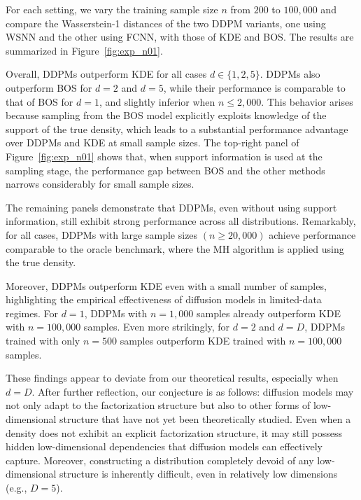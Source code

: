 \documentclass[twoside,11pt]{article}
\begin{document}
For each setting, we vary the training sample size $n$ from $200$ to $100{,}000$ and compare the Wasserstein-1 distances of the two DDPM variants, one using WSNN and the other using FCNN, with those of KDE and BOS. The results are summarized in Figure~\ref{fig:exp_n01}.

Overall, DDPMs outperform KDE for all cases $d \in \{1,2,5\}$.
DDPMs also outperform BOS for $d = 2$ and $d = 5$, while their performance is comparable to that of BOS for $d = 1$, and slightly inferior when $n \leq 2{,}000$.
This behavior arises because sampling from the BOS model explicitly exploits knowledge of the support of the true density, which leads to a substantial performance advantage over DDPMs and KDE at small sample sizes.
The top-right panel of Figure~\ref{fig:exp_n01} shows that, when support information is used at the sampling stage, the performance gap between BOS and the other methods narrows considerably for small sample sizes.

The remaining panels demonstrate that DDPMs, even without using support information, still exhibit strong performance across all distributions. Remarkably, for all cases, DDPMs with large sample sizes $(n \geq 20{,}000)$ achieve performance comparable to the oracle benchmark,  where the MH algorithm is applied using the true density.

Moreover, DDPMs outperform KDE even with a small number of samples, highlighting the empirical effectiveness of diffusion models in limited-data regimes.
For $d = 1$, DDPMs with $n = 1{,}000$ samples already outperform KDE with $n = 100{,}000$ samples.
Even more strikingly, for $d = 2$ and $d = D$, DDPMs trained with only $n =  500$ samples outperform KDE trained with $n = 100{,}000$ samples.

These findings appear to deviate from our theoretical results, especially when $d = D$. After further reflection, our conjecture is as follows: diffusion models may not only adapt to the factorization structure but also to other forms of low-dimensional structure that have not yet been theoretically studied. Even when a density does not exhibit an explicit factorization structure, it may still possess hidden low-dimensional dependencies that diffusion models can effectively capture. Moreover, constructing a distribution completely devoid of any low-dimensional structure is inherently difficult, even in relatively low dimensions (e.g., $D = 5$).
\end{document}
